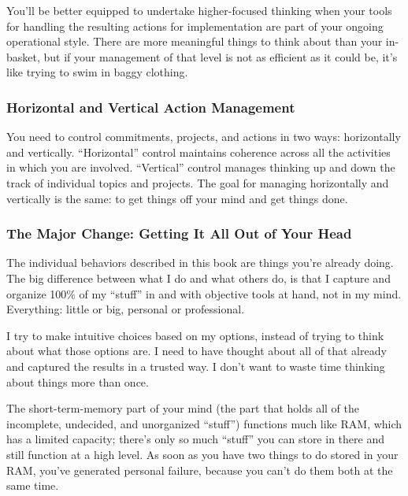 \documentclass[letterpaper]{article}
\newcommand{\p}{\vspace{1em}\par}		%
\begin{document}
\p You'll be better equipped to undertake higher-focused thinking when your tools for handling the resulting actions for implementation are part of your ongoing operational style. There are more meaningful things to think about than your in-basket, but if your management of that level is not as efficient as it could be, it's like trying to swim in baggy clothing.

\subsubsection*{Horizontal and Vertical Action Management}
You need to control commitments, projects, and actions in two ways: horizontally and vertically. ``Horizontal'' control maintains coherence across all the activities in which you are involved. ``Vertical'' control manages thinking up and down the track of individual topics and projects. The goal for managing horizontally and vertically is the same: to get things off your mind and get things done.

\subsubsection*{The Major Change: Getting It All Out of Your Head}
The individual behaviors described in this book are things you're already doing. The big difference between what I do and what others do, is that I capture and organize 100\% of my ``stuff'' in and with objective tools at hand, not in my mind. Everything: little or big, personal or professional.

\p I try to make intuitive choices based on my options, instead of trying to think about what those options are. I need to have thought about all of that already and captured the results in a trusted way. I don't want to waste time thinking about things more than once.

\p The short-term-memory part of your mind (the part that holds all of the incomplete, undecided, and unorganized ``stuff'') functions much like RAM, which has a limited capacity; there's only so much ``stuff'' you can store in there and still function at a high level. As soon as you have two things to do stored in your RAM, you've generated personal failure, because you can't do them both at the same time.
\end{document}
